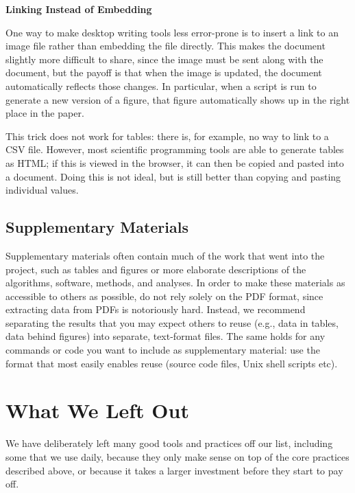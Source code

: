 \documentclass[10pt]{article}
\begin{document}
\begin{framed}
\noindent \textbf{Linking Instead of Embedding}

One way to make desktop writing tools less error-prone is to insert a
link to an image file rather than embedding the file directly.  This
makes the document slightly more difficult to share, since the image
must be sent along with the document, but the payoff is that when the
image is updated, the document automatically reflects those changes.
In particular, when a script is run to generate a new version of a
figure, that figure automatically shows up in the right place in the
paper.

This trick does not work for tables: there is, for example, no way to
link to a CSV file.  However, most scientific programming tools are
able to generate tables as HTML; if this is viewed in the browser, it
can then be copied and pasted into a document.  Doing this is not
ideal, but is still better than copying and pasting individual values.

\end{framed}

\subsection*{Supplementary Materials}

Supplementary materials often contain much of the work that went into
the project, such as tables and figures or more elaborate descriptions
of the algorithms, software, methods, and analyses. In order to make
these materials as accessible to others as possible, do not rely
solely on the PDF format, since extracting data from PDFs is
notoriously hard.  Instead, we recommend separating the results that
you may expect others to reuse (e.g., data in tables, data behind
figures) into separate, text-format files. The same holds for any
commands or code you want to include as supplementary material: use
the format that most easily enables reuse (source code files, Unix
shell scripts etc).

\section{What We Left Out}\label{sec:omitted}

We have deliberately left many good tools and practices off our list,
including some that we use daily, because they only make sense on top
of the core practices described above, or because it takes a larger
investment before they start to pay off.
\end{document}
